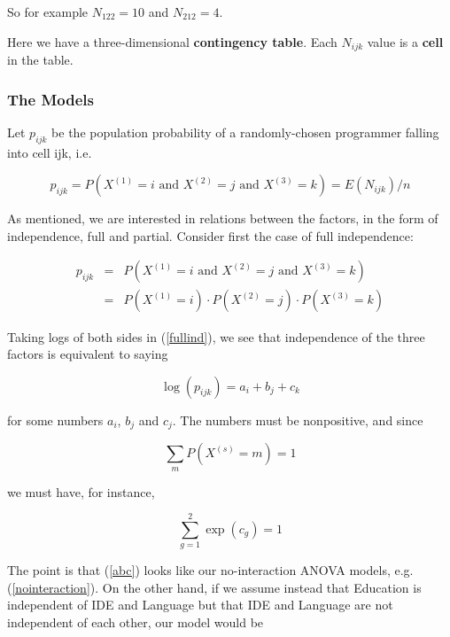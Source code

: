 So for example $N_{122} = 10$ and $N_{212} = 4$.

Here we have a three-dimensional {\bf contingency table}.  Each $N_{ijk}$
value is a {\bf cell} in the table.

\subsubsection{The Models}

Let $p_{ijk}$ be the population probability of a randomly-chosen
programmer falling into cell ijk, i.e.

\begin{equation}
p_{ijk} 
= P \left ( X^{(1)} = i \textrm{ and } X^{(2)} = j \textrm{ and } X^{(3)} = k \right ) 
= E(N_{ijk}) / n
\end{equation}

As mentioned, we are interested in relations between the factors, in the
form of independence, full and partial.  Consider first the
case of full independence:

\begin{eqnarray}
p_{ijk} &=&
P \left ( X^{(1)} = i \textrm{ and } X^{(2)} = j \textrm{ and } X^{(3)} = k \right ) \\ 
&=& P \left ( X^{(1)} = i \right )
\cdot P \left ( X^{(2)} = j \right )
\cdot P \left ( X^{(3)} = k \right ) 
\label{fullind}
\end{eqnarray}

Taking logs of both sides in (\ref{fullind}), we see that independence
of the three factors is equivalent to saying 

\begin{equation}
\label{abc}
\log(p_{ijk}) = a_i + b_j + c_k
\end{equation}

for some numbers $a_i$, $b_j$ and $c_j$.  The numbers must be
nonpositive, and since

\begin{equation}
\sum_{m} P(X^{(s)} = m) = 1
\end{equation}

we must have, for instance,

\begin{equation}
\label{sum1}
\sum_{g=1}^2 \exp(c_g) = 1
\end{equation}

The point is that (\ref{abc}) looks like our no-interaction ANOVA
models, e.g. (\ref{nointeraction}).  On the other hand, if we assume
instead that Education is independent of IDE and Language but that IDE
and Language are not independent of each other, our model would be

